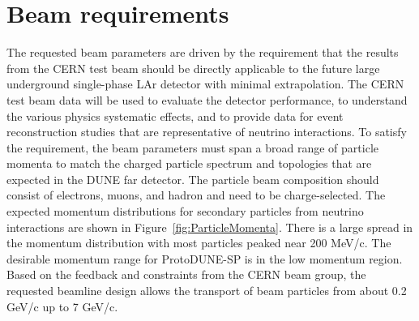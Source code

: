 \section{Beam requirements}
\label{sec:beamrequirements}

The requested beam parameters are driven by the requirement that the results from the CERN test beam should be directly applicable to the future large underground single-phase LAr detector with minimal extrapolation. The CERN test beam data will be used to evaluate the detector performance, to understand the various physics systematic effects, and to provide data for event reconstruction studies that are representative of neutrino interactions. To satisfy the requirement, the beam parameters must span a broad range of particle momenta to match the charged particle spectrum and topologies that are expected in the DUNE far detector. The particle beam composition should consist of electrons, muons, and hadron and need to be charge-selected. The expected momentum distributions for secondary particles from neutrino interactions are shown in Figure~\ref{fig:ParticleMomenta}. There is a large spread in the momentum distribution with most particles peaked near 200 MeV/c.  
The desirable momentum range for ProtoDUNE-SP  is in the low momentum region. Based on the feedback and constraints from the CERN beam group, the requested beamline design allows the transport of beam particles from about 0.2 GeV/c up to 7 GeV/c. 

